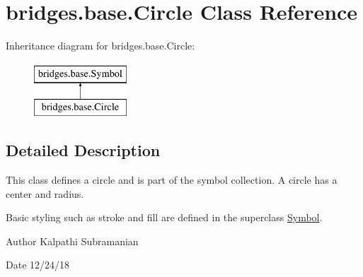 \hypertarget{classbridges_1_1base_1_1_circle}{}\section{bridges.\+base.\+Circle Class Reference}
\label{classbridges_1_1base_1_1_circle}
Inheritance diagram for bridges.\+base.\+Circle\+:\begin{figure}[H]
\begin{center}
\leavevmode
\includegraphics[height=2.000000cm]{classbridges_1_1base_1_1_circle}
\end{center}
\end{figure}


\subsection{Detailed Description}
This class defines a circle and is part of the symbol collection. A circle has a center and radius. 

Basic styling such as stroke and fill are defined in the superclass \mbox{\hyperlink{classbridges_1_1base_1_1_symbol}{Symbol}}.

\begin{DoxyAuthor}{Author}
Kalpathi Subramanian 
\end{DoxyAuthor}
\begin{DoxyDate}{Date}
12/24/18 
\end{DoxyDate}
